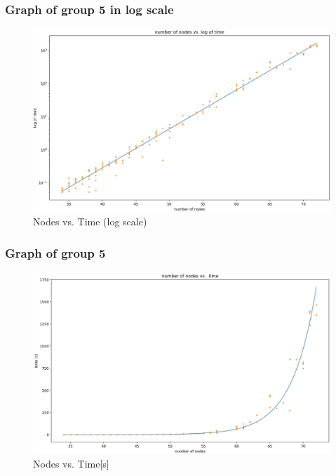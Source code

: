 \documentclass[11pt]{beamer}
\begin{document}
\begin{frame}
\frametitle{Graph of group 5 in log scale}
\begin{figure}
  \includegraphics[width=\linewidth]{log.png}
  \caption{Nodes vs. Time (log scale)}
  \label{fig:log}
\end{figure}

\end{frame}
\begin{frame}
\frametitle{Graph of group 5 }
\begin{figure}
  \includegraphics[width=\linewidth]{exp.png}
  \caption{Nodes vs. Time[s]}
  \label{fig:log}
\end{figure}
\end{frame}
\end{document}
